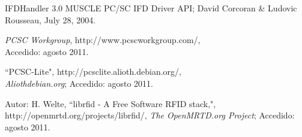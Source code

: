 \documentclass[%
        final,
        notitlepage,
        narroweqnarray,
        inline,
        ]{ieee}
\begin{document}
\begin{thebibliography}{15}
 IFDHandler 3.0 MUSCLE PC/SC IFD Driver API; David Corcoran \& Ludovic Rousseau, July 28, 2004.

 \textit{PCSC Workgroup}, http://www.pcscworkgroup.com/, \\
Accedido: agosto 2011.

 ``PCSC-Lite", http://pcsclite.alioth.debian.org/, \\
\textit{Aliothdebian.org}; Accedido: agosto 2011.

 Autor: H. Welte, ``librfid - A Free Software RFID stack,", http://openmrtd.org/projects/librfid/, \textit{The OpenMRTD.org Project}; Accedido: agosto 2011.

\end{thebibliography}



\end{document}
